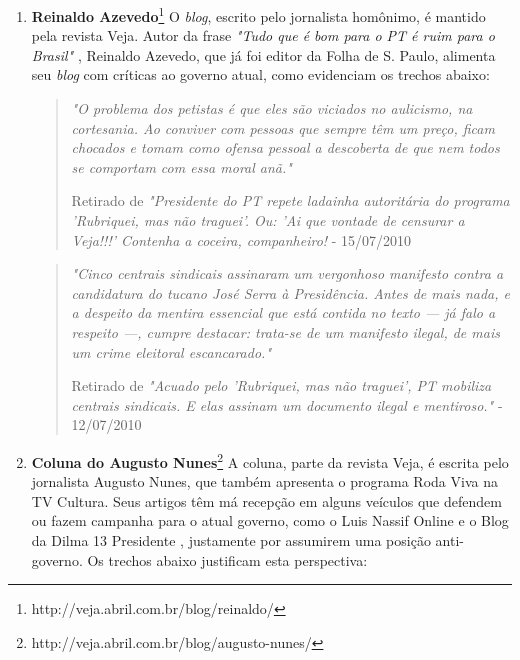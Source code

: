 \begin{enumerate}

\item \textbf{Reinaldo Azevedo}\footnote{http://veja.abril.com.br/blog/reinaldo/} O \emph{blog}, escrito pelo jornalista homônimo, é mantido pela revista Veja. Autor da frase \emph{"Tudo que é bom para o PT é ruim para o Brasil"} \cite{bom-pt-mau-brasil}, Reinaldo Azevedo, que já foi editor da Folha de S. Paulo, alimenta seu \emph{blog} com críticas ao governo atual, como evidenciam os trechos abaixo:

\begin{quote}

\emph{"O problema dos petistas é que eles são viciados no aulicismo, na cortesania. Ao conviver com pessoas que sempre têm um preço, ficam chocados e tomam como ofensa pessoal a descoberta de que nem todos se comportam com essa moral anã."}

{\small Retirado de \emph{"Presidente do PT repete ladainha autoritária do programa 'Rubriquei, mas não traguei'. Ou: 'Ai que vontade de censurar a Veja!!!' Contenha a coceira, companheiro!} - 15/07/2010} 
\end{quote}

\begin{quote}

\emph{"Cinco centrais sindicais assinaram um vergonhoso manifesto contra a candidatura do tucano José Serra à Presidência. Antes de mais nada, e a despeito da mentira essencial que está contida no texto — já falo a respeito —, cumpre destacar: trata-se de um manifesto ilegal, de mais um crime eleitoral escancarado."}

{\small Retirado de \emph{"Acuado pelo 'Rubriquei, mas não traguei', PT mobiliza centrais sindicais. E elas assinam um documento ilegal e mentiroso."} - 12/07/2010 }

\end{quote}

\item \textbf{Coluna do Augusto Nunes}\footnote{http://veja.abril.com.br/blog/augusto-nunes/} A coluna, parte da revista Veja, é escrita pelo jornalista Augusto Nunes, que também apresenta o programa Roda Viva na TV Cultura. Seus artigos têm má recepção em alguns veículos que defendem ou fazem campanha para o atual governo, como o Luis Nassif Online \cite{nassif-nunes} e o Blog da Dilma 13 Presidente \cite{dilma13-nunes}, justamente por assumirem uma posição anti-governo. Os trechos abaixo justificam esta perspectiva:



\end{enumerate}
